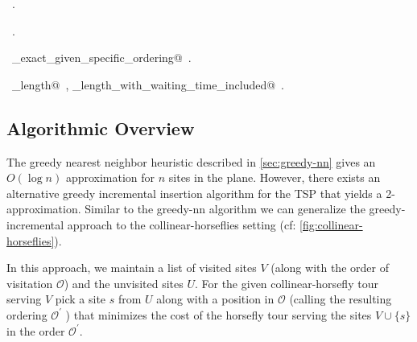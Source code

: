 \documentclass[11.5pt]{report}
\begin{document}
\begin{flushleft}
\begin{list}{}{}
\mbox{}\verb@                                                    horseflyinit)}@\\
\mbox{}\verb@   @\\
\mbox{}\verb@@{\NWsep}
\end{list}
\vspace{-1.5ex}
\footnotesize
\begin{list}{}{\setlength{\itemsep}{-\parsep}\setlength{\itemindent}{-\leftmargin}}
\item \NWtxtMacroDefBy\ .
\item \NWtxtMacroRefIn\ .
\item \NWtxtIdentsDefed\nobreak\  \verb@algo_exact_given_specific_ordering@\nobreak\ .\item \NWtxtIdentsUsed\nobreak\  \verb@tour_length@\nobreak\ , \verb@tour_length_with_waiting_time_included@\nobreak\ .
\item{}
\end{list}
\vspace{4ex}
\end{flushleft}
\subsection*{Algorithmic Overview}
\newchunk The greedy nearest neighbor heuristic described in \autoref{sec:greedy-nn} gives an $O(\log n)$ 
          approximation for $n$ sites in the plane. However, there exists an alternative greedy incremental 
          insertion algorithm for the TSP that yields a 2-approximation. Similar to the greedy-nn algorithm 
          we can generalize the greedy-incremental approach to the collinear-horseflies setting 
          (cf: \autoref{fig:collinear-horseflies}). 

\newchunk In this approach, we maintain a list of visited sites $V$ (along with the order of visitation 
          $\mathcal{O}$) and the unvisited sites $U$. For the given collinear-horsefly tour serving $V$ 
          pick a site $s$ from $U$ along with a position in $\mathcal{O}$ (calling the resulting ordering  
          $\mathcal{O^{'}}$  ) that minimizes the cost of the horsefly tour serving the sites $V \cup \{s\}$ 
          in the order $\mathcal{O^{'}}$. 
\end{document}
